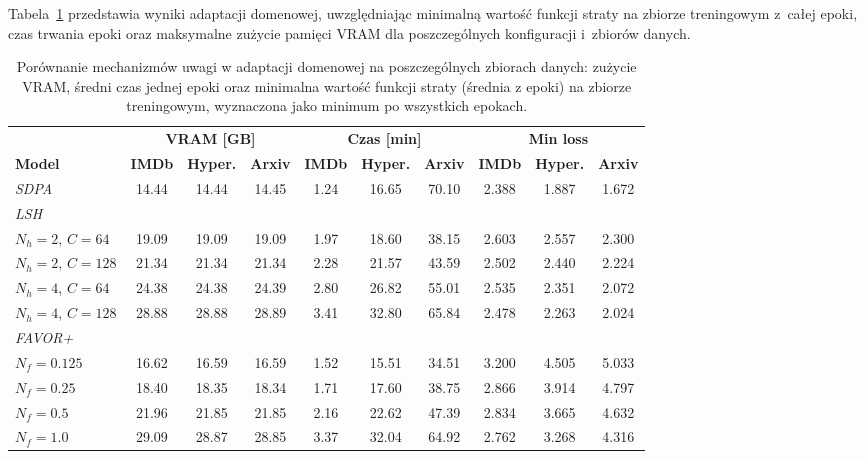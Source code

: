 \documentclass[a4paper,11pt,twoside]{report}
\theoremstyle{definition}
\begin{document}
Tabela~\ref{tab:attention-metrics-all-datasets} przedstawia wyniki adaptacji domenowej, uwzględniając minimalną wartość funkcji straty na zbiorze treningowym z~całej epoki, czas trwania epoki oraz maksymalne zużycie pamięci VRAM dla poszczególnych konfiguracji i~zbiorów danych.


\begin{table}[t!]
\centering
\caption{Porównanie mechanizmów uwagi w adaptacji domenowej na poszczególnych zbiorach danych: zużycie VRAM, średni czas jednej epoki oraz minimalna wartość funkcji straty (średnia z epoki) na zbiorze treningowym, wyznaczona jako minimum po wszystkich epokach.}
\smallskip
\label{tab:attention-metrics-all-datasets}
\small
\begin{tabular}{@{}lccccccccc@{}}
\toprule
& \multicolumn{3}{c}{\textbf{\textbf{VRAM [GB]}}} & \multicolumn{3}{c}{\textbf{\textbf{Czas [min]}}} & \multicolumn{3}{c}{\textbf{\textbf{Min loss}}} \\
\cmidrule(lr){2-4}
\cmidrule(lr){5-7}
\cmidrule(lr){8-10}
\textbf{Model} & \textbf{IMDb} & \textbf{Hyper.} & \textbf{Arxiv} & \textbf{IMDb} & \textbf{Hyper.} & \textbf{Arxiv} & \textbf{IMDb} & \textbf{Hyper.} & \textbf{Arxiv} \\
\midrule
\textit{SDPA} & 14.44 & 14.44 & 14.45 & 1.24 & 16.65 & 70.10 & 2.388 & 1.887 & 1.672 \\
\midrule
\multicolumn{10}{l}{\textit{LSH}} \\
$N_h{=}2$, $C{=}64$ & 19.09 & 19.09 & 19.09 & 1.97 & 18.60 & 38.15 & 2.603 & 2.557 & 2.300 \\
$N_h{=}2$, $C{=}128$ & 21.34 & 21.34 & 21.34 & 2.28 & 21.57 & 43.59 & 2.502 & 2.440 & 2.224 \\
$N_h{=}4$, $C{=}64$ & 24.38 & 24.38 & 24.39 & 2.80 & 26.82 & 55.01 & 2.535 & 2.351 & 2.072 \\
$N_h{=}4$, $C{=}128$ & 28.88 & 28.88 & 28.89 & 3.41 & 32.80 & 65.84 & 2.478 & 2.263 & 2.024 \\
\midrule
\multicolumn{10}{l}{\textit{FAVOR+}} \\
$N_f{=}0.125$ & 16.62 & 16.59 & 16.59 & 1.52 & 15.51 & 34.51 & 3.200 & 4.505 & 5.033 \\
$N_f{=}0.25$ & 18.40 & 18.35 & 18.34 & 1.71 & 17.60 & 38.75 & 2.866 & 3.914 & 4.797 \\
$N_f{=}0.5$ & 21.96 & 21.85 & 21.85 & 2.16 & 22.62 & 47.39 & 2.834 & 3.665 & 4.632 \\
$N_f{=}1.0$ & 29.09 & 28.87 & 28.85 & 3.37 & 32.04 & 64.92 & 2.762 & 3.268 & 4.316 \\
\bottomrule
\end{tabular}
\end{table}
\end{document}
